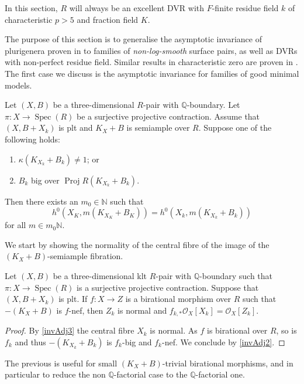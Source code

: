 \documentclass[a4paper,12pt]{book}
\DeclareMathOperator{\Spec}{Spec}
\DeclareMathOperator{\Proj}{Proj}
\newcommand{\bN}{\mathbb{N}}
\newcommand{\ox}{\mathcal{O}_{X}}
\begin{document}
	
	In this section, $R$ will always be an excellent DVR with $F$-finite residue field $k$ of characteristic $p>5$ and fraction field $K$. 
	
	The purpose of this section is to generalise the asymptotic invariance of plurigenera proven in \cite[Theorem 3.1]{EH} to families of \emph{non-log-smooth} surface pairs, as well as DVRs with non-perfect residue field. Similar results in characteristic zero are proven in \cite{HMX13, HMX18}.
	The first case we discuss is the asymptotic invariance for families of good minimal models.
	
	\begin{theorem}\label{thm:ADIOP_SA}
		Let $(X,B)$ be a three-dimensional $R$-pair with $\mathbb{Q}$-boundary.
		Let $\pi \colon X \to\Spec (R)$ be a  surjective projective contraction. Assume that $(X,B+X_k)$ is plt and $K_X+B$ is semiample over $R$.
		Suppose one of the following holds:
		\begin{enumerate}
			\item $\kappa(K_{X_k}+B_k)\neq 1$; or
			\item  $B_k$ big over $\Proj R(K_{X_k}+B_k)$.
		\end{enumerate} 
		Then there exists an $m_{0} \in \mathbb{N}$ such that 
		$$h^0(X_K,m(K_{X_K}+B_K))=h^0(X_k,m(K_{X_k}+B_k))$$
		for all $m\in m_0\bN$.
	\end{theorem}
	
	We start by showing the normality of the central fibre of the image of the $(K_X+B)$-semiample fibration.
	
	\begin{proposition}\label{p-gen-case}
		Let $(X,B)$ be a three-dimensional klt $R$-pair with $\mathbb{Q}$-boundary such that $\pi \colon X \to\Spec (R)$ is a surjective projective contraction.
		Suppose that $(X,B+X_{k})$ is plt. If $f \colon X \to Z$ is a birational morphism over $R$ such that $-(K_{X}+B)$ is $f$-nef, then $Z_k$ is normal and $f_{k,*}\ox[X_{k}]=\ox[Z_{k}]$.
	\end{proposition}
	
	\begin{proof}
		By \autoref{invAdj3} the central fibre $X_{k}$ is normal. 
		As $f$ is birational over $R$, so is $f_{k}$ and thus $-(K_{X_{k}}+B_{k})$ is $f_{k}$-big and $f_k$-nef. We conclude by \autoref{invAdj2}.
	\end{proof}
	
	The previous is useful for small $(K_{X}+B)$-trivial birational morphisms, and in particular to reduce the non $\mathbb{Q}$-factorial case to the $\mathbb{Q}$-factorial one.
	
\end{document}
